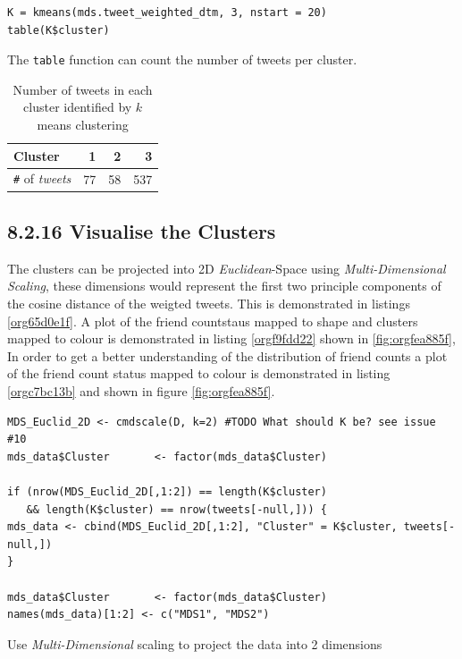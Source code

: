 \documentclass[11pt]{article}
\begin{document}
\begin{listing}[htbp]
\begin{verbatim}
K = kmeans(mds.tweet_weighted_dtm, 3, nstart = 20)
table(K$cluster)
\end{verbatim}
\caption{\label{org26993db}The \texttt{table} function can count the number of tweets per cluster.}
\end{listing}

\begin{table}[htbp]
\caption{\label{tab:org429b520}Number of tweets in each cluster identified by \(k\) means clustering}
\centering
\begin{tabular}{lrrr}
Cluster & 1 & 2 & 3\\
\hline
\texttt{\#} of \emph{tweets} & 77 & 58 & 537\\
\end{tabular}
\end{table}

\subsection{8.2.16 Visualise the Clusters}
\label{sec:orgde77dca}
The clusters can be projected into 2D \emph{Euclidean}-Space using \emph{Multi-Dimensional
Scaling}, these dimensions would represent the first two principle components of
the cosine distance of the weigted tweets. This is demonstrated in listings
\ref{org65d0e1f}. A plot of the friend countstaus mapped to shape and clusters mapped to
colour is demonstrated in listing \ref{orgf9fdd22} shown in \ref{fig:orgfea885f}, In order to get a better
understanding of the distribution of friend counts a plot of the friend count
status mapped to colour is demonstrated in listing \ref{orgc7bc13b} and shown in figure \ref{fig:orgfea885f}.

\begin{listing}[htbp]
\begin{verbatim}
MDS_Euclid_2D <- cmdscale(D, k=2) #TODO What should K be? see issue #10
mds_data$Cluster       <- factor(mds_data$Cluster)

if (nrow(MDS_Euclid_2D[,1:2]) == length(K$cluster)
   && length(K$cluster) == nrow(tweets[-null,])) {
mds_data <- cbind(MDS_Euclid_2D[,1:2], "Cluster" = K$cluster, tweets[-null,])
}

mds_data$Cluster       <- factor(mds_data$Cluster)
names(mds_data)[1:2] <- c("MDS1", "MDS2")
\end{verbatim}
\caption{\label{org65d0e1f}Use \emph{Multi-Dimensional} scaling to project the data into 2 dimensions}
\end{listing}
\end{document}
